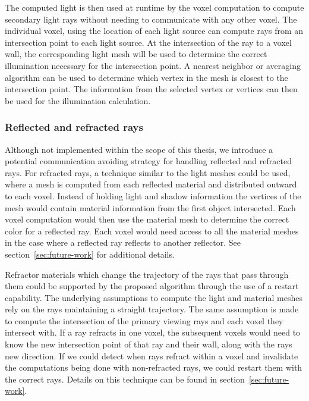 The computed light is then used at runtime by the voxel computation to 
compute secondary light rays without needing to communicate with any other 
voxel.  The individual voxel, using the location of each light source can 
compute rays from an intersection point to each light source.  At the 
intersection of the ray to a voxel wall, the corresponding light mesh will be 
used to determine the correct illumination necessary for the intersection point.
A nearest neighbor or averaging algorithm can be used to determine which vertex 
in the mesh is closest to the intersection point.  The information from the 
selected vertex or vertices can then be used for the illumination calculation.

\subsubsection{Reflected and refracted rays}
Although not implemented within the scope of this thesis, we introduce a 
potential communication avoiding strategy for handling reflected and refracted 
rays.  For refracted rays, a technique similar to the light meshes could be 
used, where a mesh is computed from each reflected material and distributed 
outward to each voxel.  Instead of holding light and shadow information the 
vertices of the mesh would contain material information from the first object 
intersected.  Each voxel computation would then use the material mesh to 
determine the correct color for a reflected ray.  Each voxel would need access 
to all the material meshes in the case where a reflected ray reflects to another
reflector.  See section~\ref{sec:future-work} for additional details.

Refractor materials which change the trajectory of the rays that pass through 
them could be supported by the proposed algorithm through the use of a restart 
capability.  The underlying assumptions to compute the light and material meshes
rely on the rays maintaining a straight trajectory.  The same assumption is made
to compute the intersection of the primary viewing rays and each voxel they
intersect with.  If a ray refracts in one voxel, the subsequent voxels would
need to know the new intersection point of that ray and their wall, along with
the rays new direction.  If we could detect when rays refract within a voxel and
invalidate the computations being done with non-refracted rays, we could restart
them with the correct rays.  Details on this technique can be found in 
section~\ref{sec:future-work}.

